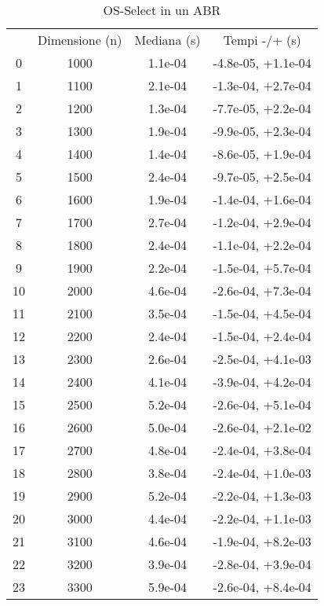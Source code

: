 \begin{table}
\centering
\caption{OS-Select in un ABR}
\label{OS-Select in un ABR}
\begin{adjustbox}{width=1\textwidth/2}
\begin{tabular}{|c|c|c|c|}
\hline
 & Dimensione (n) & Mediana (s) & Tempi -/+ (s) \\
0 & 1000 & 1.1e-04 & -4.8e-05, +1.1e-04 \\
\cline{1-4}
1 & 1100 & 2.1e-04 & -1.3e-04, +2.7e-04 \\
\cline{1-4}
2 & 1200 & 1.3e-04 & -7.7e-05, +2.2e-04 \\
\cline{1-4}
3 & 1300 & 1.9e-04 & -9.9e-05, +2.3e-04 \\
\cline{1-4}
4 & 1400 & 1.4e-04 & -8.6e-05, +1.9e-04 \\
\cline{1-4}
5 & 1500 & 2.4e-04 & -9.7e-05, +2.5e-04 \\
\cline{1-4}
6 & 1600 & 1.9e-04 & -1.4e-04, +1.6e-04 \\
\cline{1-4}
7 & 1700 & 2.7e-04 & -1.2e-04, +2.9e-04 \\
\cline{1-4}
8 & 1800 & 2.4e-04 & -1.1e-04, +2.2e-04 \\
\cline{1-4}
9 & 1900 & 2.2e-04 & -1.5e-04, +5.7e-04 \\
\cline{1-4}
10 & 2000 & 4.6e-04 & -2.6e-04, +7.3e-04 \\
\cline{1-4}
11 & 2100 & 3.5e-04 & -1.5e-04, +4.5e-04 \\
\cline{1-4}
12 & 2200 & 2.4e-04 & -1.5e-04, +2.4e-04 \\
\cline{1-4}
13 & 2300 & 2.6e-04 & -2.5e-04, +4.1e-03 \\
\cline{1-4}
14 & 2400 & 4.1e-04 & -3.9e-04, +4.2e-04 \\
\cline{1-4}
15 & 2500 & 5.2e-04 & -2.6e-04, +5.1e-04 \\
\cline{1-4}
16 & 2600 & 5.0e-04 & -2.6e-04, +2.1e-02 \\
\cline{1-4}
17 & 2700 & 4.8e-04 & -2.4e-04, +3.8e-04 \\
\cline{1-4}
18 & 2800 & 3.8e-04 & -2.4e-04, +1.0e-03 \\
\cline{1-4}
19 & 2900 & 5.2e-04 & -2.2e-04, +1.3e-03 \\
\cline{1-4}
20 & 3000 & 4.4e-04 & -2.2e-04, +1.1e-03 \\
\cline{1-4}
21 & 3100 & 4.6e-04 & -1.9e-04, +8.2e-03 \\
\cline{1-4}
22 & 3200 & 3.9e-04 & -2.8e-04, +3.9e-04 \\
\cline{1-4}
23 & 3300 & 5.9e-04 & -2.6e-04, +8.4e-04 \\

\end{tabular}
\end{adjustbox}
\end{table}

